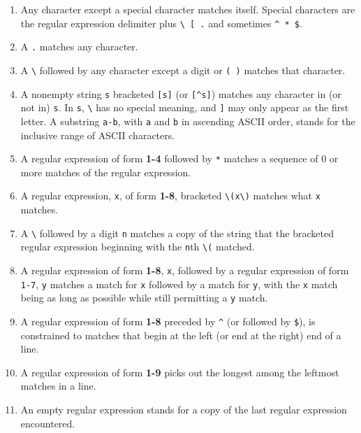 \begin{enumerate}

\item  Any character except a special character matches itself.  Special
characters are the regular expression delimiter plus \verb|\ [ .| and
sometimes \verb|^ * $|.

\item  A \verb"." matches any character.

\item  A \verb|\| followed by any character except a digit or \verb|( )|
matches that character.

\item  A nonempty string \verb|s| bracketed \verb|[s]| (or \verb|[^s]|)
matches any character in (or not in) \verb|s|. In \verb|s|, \verb|\| has no
special meaning, and \verb|]| may only appear as the first letter. A
substring \verb|a-b|, with \verb|a| and \verb|b| in ascending ASCII order,
stands for the inclusive range of ASCII characters.

\item  A regular expression of form {\bf 1-4} followed by \verb|*| matches a
sequence of 0 or more matches of the regular expression.

\item  A regular expression, \verb"x", of form {\bf 1-8}, bracketed
\verb"\(x\)" matches what \verb"x" matches.

\item  A \verb"\" followed by a digit \verb|n| matches a copy of the string
that the bracketed regular expression beginning with the \verb|n|th
\verb|\(| matched.

\item  A regular expression of form {\bf 1-8}, \verb"x", followed by a
regular expression of form \verb"1-7", \verb"y" matches a match for \verb"x"
followed by a match for \verb"y", with the \verb"x" match being as long as
possible while still permitting a \verb"y" match.

\item  A regular expression of form {\bf 1-8} preceded by \verb"^" (or
followed by \verb"$"), is constrained to matches that begin at the left (or
end at the right) end of a line.

\item  A regular expression of form {\bf 1-9} picks out the longest among
the leftmost matches in a line.

\item  An empty regular expression stands for a copy of the last regular
expression encountered.

\end{enumerate}

